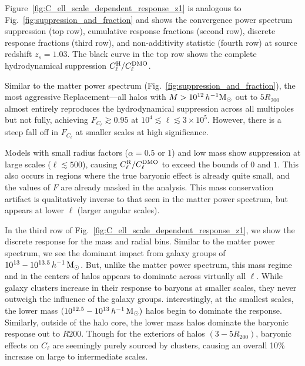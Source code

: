 \documentclass[linenumbers,trackchanges]{aastex701}
\begin{document}
Figure~\ref{fig:C_ell_scale_dependent_response_z1} is analogous to Fig.~\ref{fig:suppression_and_fraction} and shows the convergence power spectrum suppression (top row), cumulative response fractions (second row), discrete response fractions (third row), and non-additivity statistic (fourth row) at source redshift $z_s = 1.03$. The black curve in the top row shows the complete hydrodynamical suppression $C_\ell^{\rm H}/C_\ell^{\rm DMO}$.

Similar to the matter power spectrum (Fig.~\ref{fig:suppression_and_fraction}), the most aggressive Replacement—all halos with $M > 10^{12}\,h^{-1}{\rm M}_\odot$ out to $5R_{200}$ almost entirely reproduces the hydrodynamical suppression across all multipoles but not fully, achieving $F_{C_\ell} \gtrsim 0.95$ at $10^4\lesssim \ell \lesssim 3\times10^5$. However, there is a steep fall off in $F_{C_\ell}$ at smaller scales at high significance.

Models with small radius factors ($\alpha = 0.5$ or $1$) and low mass show suppression at large scales ($\ell \lesssim 500$), causing $C_\ell^{\rm R}/C_\ell^{\rm DMO}$ to exceed the bounds of $0$ and $1$. This also occurs in regions where the true baryonic effect is already quite small, and the values of $F$ are already masked in the analysis. This mass conservation artifact is qualitatively inverse to that seen in the matter power spectrum, but appears at lower $\ell$ (larger angular scales).

In the third row of Fig.~\ref{fig:C_ell_scale_dependent_response_z1}, we show the discrete response for the mass and radial bins. Similar to the matter power spectrum, we see the dominant impact from galaxy groups of $10^{13} -10^{13.5}\,h^{-1}\,{\rm M}_\odot$. But, unlike the matter power spectrum, this mass regime and in the centers of halos appears to dominate across virtually all $\ell$. While galaxy clusters increase in their response to baryons at smaller scales, they never outweigh the influence of the galaxy groups. interestingly, at the smallest scales, the lower mass $(10^{12.5}-10^{13}\,h^{-1}\,{\rm M}_\odot)$ halos begin to dominate the response. Similarly, outside of the halo core, the lower mass halos dominate the baryonic response out to $R{200}$. Though for the exteriors of halos $(3-5R_{200})$, baryonic effects on $C_\ell$ are seemingly purely sourced by clusters, causing an overall 10\% increase on large to intermediate scales.
\end{document}
